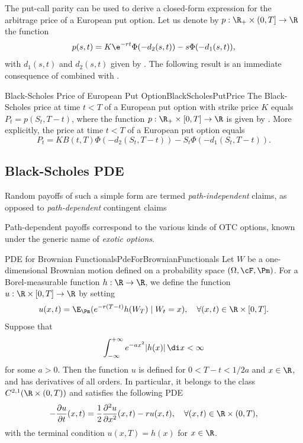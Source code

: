 The put-call parity can be used to derive a closed-form expression for the arbitrage price of a European put option. Let us denote by $p : \R_+ \times (0, T] \to \R$ the function
\begin{equation} \label{eq:PutOptionFunction}
	p(s,t) = K \e^{-rt} \Phi(-d_2(s,t)) - s \Phi(-d_1(s,t)),
\end{equation}
with $d_1(s,t)$ and $d_2(s,t)$ given by . The following result is an immediate consequence of  combined with .

\begin{cor}{Black-Scholes Price of European Put Option}{BlackScholesPutPrice}
	The Black-Scholes price at time $t < T$ of a European put option with strike price $K$ equals $P_t = p(S_t, T - t)$, where the function $p : \R_+ \times [0, T] \to \R$ is given by . More explicitly, the price at time $t < T$ of a European put option equals
	\begin{equation}
		P_t = K B(t, T) \Phi(-d_2(S_t, T - t)) - S_t \Phi(-d_1(S_t, T - t)).
	\end{equation}
\end{cor}

\subsection{Black-Scholes PDE}
Random payoffs of such a simple form are termed \textit{path-independent} claims, as opposed to \textit{path-dependent} contingent claims

Path-dependent payoffs correspond to the various kinds of OTC options, known under the generic name of \textit{exotic options}.

\begin{lem}{PDE for Brownian Functionals}{PdeForBrownianFunctionals}
	Let $W$ be a one-dimensional Brownian motion defined on a probability space $(\Omega, \cF, \Pm)$. For a Borel-measurable function $h : \R \to \R$, we define the function $u : \R \times [0, T] \to \R$ by setting
	\begin{equation}
		u(x, t) = \E_{\Pm}(e^{-r(T-t)} h(W_T) \mid W_t = x), \quad \forall (x, t) \in \R \times [0, T].
	\end{equation}
	Suppose that
	\begin{equation}
		\int_{-\infty}^{+\infty} e^{-ax^2} |h(x)| \, \di x < \infty
	\end{equation}
	for some $a > 0$. Then the function $u$ is defined for $0 < T - t < 1/2a$ and $x \in \R$, and has derivatives of all orders. In particular, it belongs to the class $C^{2,1}(\R \times (0, T))$ and satisfies the following PDE
	\begin{equation}
		-\frac{\partial u}{\partial t}(x, t) = \frac{1}{2} \frac{\partial^2 u}{\partial x^2}(x, t) - ru(x, t), \quad \forall (x, t) \in \R \times (0, T),
	\end{equation}
	with the terminal condition $u(x, T) = h(x)$ for $x \in \R$.
\end{lem}
